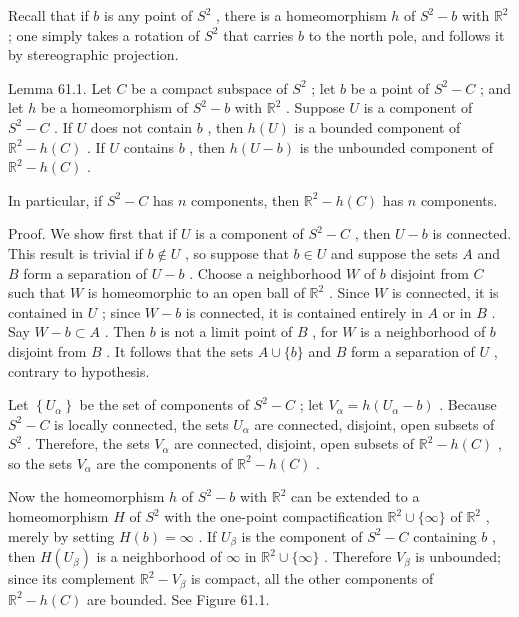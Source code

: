 Recall that if \(b\) is any point of \({S}^{2}\) , there is a homeomorphism \(h\) of \({S}^{2} - b\) with \({\mathbb{R}}^{2}\) ; one simply takes a rotation of \({S}^{2}\) that carries \(b\) to the north pole, and follows it by stereographic projection.

Lemma 61.1. Let \(C\) be a compact subspace of \({S}^{2}\) ; let \(b\) be a point of \({S}^{2} - C\) ; and let \(h\) be a homeomorphism of \({S}^{2} - b\) with \({\mathbb{R}}^{2}\) . Suppose \(U\) is a component of \({S}^{2} - C\) . If \(U\) does not contain \(b\) , then \(h\left( U\right)\) is a bounded component of \({\mathbb{R}}^{2} - h\left( C\right)\) . If \(U\) contains \(b\) , then \(h\left( {U - b}\right)\) is the unbounded component of \({\mathbb{R}}^{2} - h\left( C\right)\) .

In particular, if \({S}^{2} - C\) has \(n\) components, then \({\mathbb{R}}^{2} - h\left( C\right)\) has \(n\) components.

Proof. We show first that if \(U\) is a component of \({S}^{2} - C\) , then \(U - b\) is connected. This result is trivial if \(b \notin  U\) , so suppose that \(b \in  U\) and suppose the sets \(A\) and \(B\) form a separation of \(U - b\) . Choose a neighborhood \(W\) of \(b\) disjoint from \(C\) such that \(W\) is homeomorphic to an open ball of \({\mathbb{R}}^{2}\) . Since \(W\) is connected, it is contained in \(U\) ; since \(W - b\) is connected, it is contained entirely in \(A\) or in \(B\) . Say \(W - b \subset  A\) . Then \(b\) is not a limit point of \(B\) , for \(W\) is a neighborhood of \(b\) disjoint from \(B\) . It follows that the sets \(A \cup  \{ b\}\) and \(B\) form a separation of \(U\) , contrary to hypothesis.

Let \(\left\{  {U}_{\alpha }\right\}\) be the set of components of \({S}^{2} - C\) ; let \({V}_{\alpha } = h\left( {{U}_{\alpha } - b}\right)\) . Because \({S}^{2} - C\) is locally connected, the sets \({U}_{\alpha }\) are connected, disjoint, open subsets of \({S}^{2}\) . Therefore, the sets \({V}_{\alpha }\) are connected, disjoint, open subsets of \({\mathbb{R}}^{2} - h\left( C\right)\) , so the sets \({V}_{\alpha }\) are the components of \({\mathbb{R}}^{2} - h\left( C\right)\) .

Now the homeomorphism \(h\) of \({S}^{2} - b\) with \({\mathbb{R}}^{2}\) can be extended to a homeomorphism \(H\) of \({S}^{2}\) with the one-point compactification \({\mathbb{R}}^{2} \cup  \{ \infty \}\) of \({\mathbb{R}}^{2}\) , merely by setting \(H\left( b\right)  = \infty\) . If \({U}_{\beta }\) is the component of \({S}^{2} - C\) containing \(b\) , then \(H\left( {U}_{\beta }\right)\) is a neighborhood of \(\infty\) in \({\mathbb{R}}^{2} \cup  \{ \infty \}\) . Therefore \({V}_{\beta }\) is unbounded; since its complement \({\mathbb{R}}^{2} - {V}_{\beta }\) is compact, all the other components of \({\mathbb{R}}^{2} - h\left( C\right)\) are bounded. See Figure 61.1.

